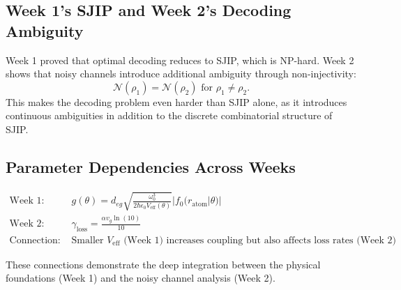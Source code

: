 \documentclass[12pt,a4paper]{article}
\begin{document}
\subsection{Week 1's SJIP and Week 2's Decoding Ambiguity}
Week 1 proved that optimal decoding reduces to SJIP, which is NP-hard. Week 2 shows that noisy channels introduce additional ambiguity through non-injectivity:
\[
\mathcal{N}(\rho_1) = \mathcal{N}(\rho_2) \text{ for } \rho_1 \neq \rho_2.
\]
This makes the decoding problem even harder than SJIP alone, as it introduces continuous ambiguities in addition to the discrete combinatorial structure of SJIP.

\subsection{Parameter Dependencies Across Weeks}
\begin{align}
    \text{Week 1: } & g(\theta) = d_{eg}\sqrt{\frac{\omega_0^3}{2\hbar\epsilon_0 V_{\text{eff}}(\theta)}} |f_0(r_{\text{atom}}|\theta)| \\
    \text{Week 2: } & \gamma_{\text{loss}} = \frac{\alpha v_g \ln(10)}{10} \\
    \text{Connection: } & \text{Smaller } V_{\text{eff}} \text{ (Week 1) increases coupling but also affects loss rates (Week 2)}
\end{align}

These connections demonstrate the deep integration between the physical foundations (Week 1) and the noisy channel analysis (Week 2).
\end{document}
